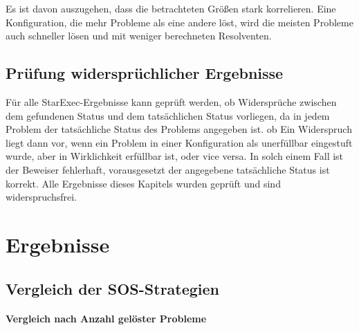 	Es ist davon auszugehen, dass die betrachteten Größen stark korrelieren. Eine Konfiguration, die mehr Probleme als eine andere löst, wird die meisten Probleme auch schneller lösen und mit weniger berechneten Resolventen.
	
	\subsection{Prüfung widersprüchlicher Ergebnisse}
		Für alle StarExec-Ergebnisse kann geprüft werden, ob Widersprüche zwischen dem gefundenen Status und dem tatsächlichen Status vorliegen, da in jedem Problem der tatsächliche Status des Problems angegeben ist. ob  Ein Widerspruch liegt dann vor, wenn ein Problem in einer Konfiguration als unerfüllbar eingestuft wurde, aber in Wirklichkeit erfüllbar ist, oder vice versa. In solch einem Fall ist der Beweiser fehlerhaft, vorausgesetzt der angegebene tatsächliche Status ist korrekt. Alle Ergebnisse dieses Kapitels wurden geprüft und sind widerspruchsfrei.

\section{Ergebnisse}
	\subsection{Vergleich der SOS-Strategien}
		\paragraph{Vergleich nach Anzahl gelöster Probleme}
		
